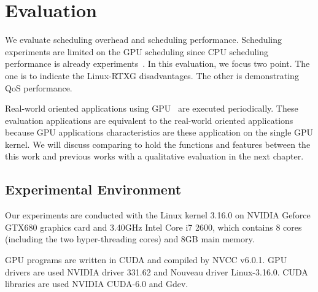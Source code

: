 \section{Evaluation}\label{sec:evaluation}
We evaluate scheduling overhead and scheduling performance.
Scheduling experiments are limited on the GPU scheduling since CPU scheduling performance is already experiments~\cite{kato2009loadable}.
In this evaluation, we focus two point.
The one is to indicate the Linux-RTXG disadvantages.
The other is demonstrating QoS performance.

Real-world oriented applications using GPU~\cite{hirabayashi:cpsna2013,tokamak} are executed periodically.
These evaluation applications are equivalent to the real-world oriented applications
because GPU applications characteristics are these application on the single GPU kernel.
We will discuss comparing to hold the functions and features between the this work and previous works with a qualitative evaluation in the next chapter.

\subsection{Experimental Environment}
Our experiments are conducted with the Linux kernel 3.16.0 on NVIDIA Geforce GTX680 graphics card and 3.40GHz Intel Core i7 2600, which contains 8 cores (including the two hyper-threading cores) and 8GB main memory.

GPU programs are written in CUDA and compiled by NVCC v6.0.1.
GPU drivers are used NVIDIA driver 331.62 and Nouveau driver Linux-3.16.0.
CUDA libraries are used NVIDIA CUDA-6.0 and Gdev.

